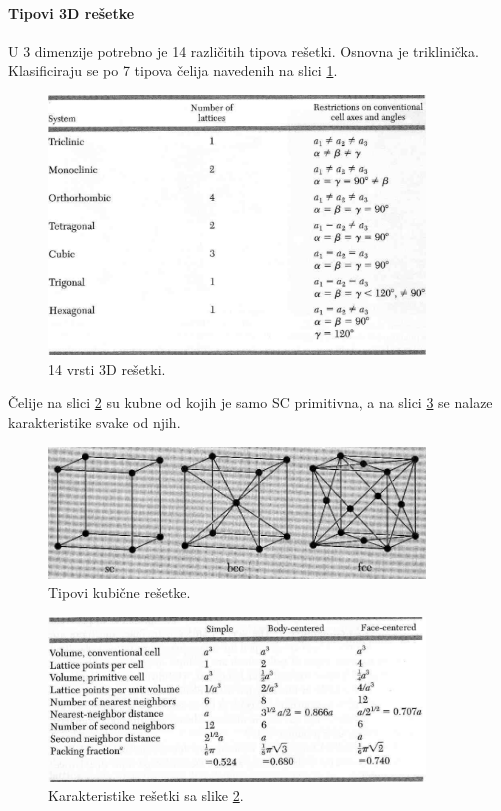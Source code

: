 \documentclass{article}
\numberwithin{equation}{section}
\begin{document}
\paragraph{Tipovi 3D rešetke}
U 3 dimenzije potrebno je 14 različitih tipova rešetki. Osnovna je triklinička. Klasificiraju se po 7 tipova čelija navedenih na slici \ref{fig:S6}. 

\begin{figure}[h!]
    \centering
    \includegraphics[width=10cm]{Slika_5.PNG}
    \caption{14 vrsti 3D rešetki.}
    \label{fig:S6}
\end{figure}
Čelije na slici \ref{fig:S7} su kubne od kojih je samo SC primitivna, a na slici \ref{fig:S8} se nalaze karakteristike svake od njih.
\begin{figure}[h!]
    \centering
    \includegraphics[width=10cm]{Slika_6.PNG}
    \caption{Tipovi kubične rešetke.}
    \label{fig:S7}
\end{figure}

\begin{figure}[h!]
    \centering
    \includegraphics[width=10cm]{Slika_7.PNG}
    \caption{Karakteristike rešetki sa slike \ref{fig:S7}.}
    \label{fig:S8}
\end{figure}
\end{document}
